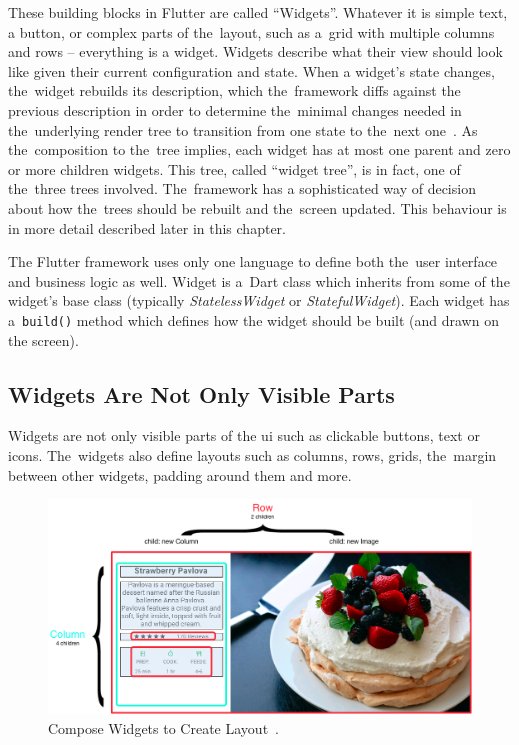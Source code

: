 These building blocks in Flutter are called ``Widgets''. Whatever it is simple text, a button, or complex parts of the~layout, such as a~grid with multiple columns and rows -- everything is a widget.  Widgets describe what their view should look like given their current configuration and state. When a widget's state changes, the~widget rebuilds its description, which the~framework diffs against the previous description in order to determine the~minimal changes needed in the~underlying render tree to transition from one state to the~next one~\cite{flutter-widget-intro}. As the~composition to the~tree implies, each widget has at most one parent and zero or more children widgets. This tree, called ``widget tree'', is in fact, one of the~three trees involved. The~framework has a sophisticated way of decision about how the~trees should be rebuilt and the~screen updated. This behaviour is in more detail described later in this chapter.

The Flutter framework uses only one language to define both the~user interface and business logic as well. Widget is a~Dart class which inherits from some of the widget's base class (typically \textit{StatelessWidget} or \textit{StatefulWidget}). Each widget has a~\verb|build()| method which defines how the widget should be built (and drawn on the screen). 
\subsection{Widgets Are Not Only Visible Parts}
Widgets are not only visible parts of the \gls{ui} such as clickable buttons, text or icons. The~widgets also define layouts such as columns, rows, grids, the~margin between other widgets, padding around them and more. 

\begin{figure}[htp]
    \centering
    \includegraphics[width=0.9\linewidth]{img/flutter/layout_compose.png}
    \caption{Compose Widgets to Create Layout~\cite{flutter-widget-layout}.}
    \label{fig:flutter-compose-widget}
\end{figure}

